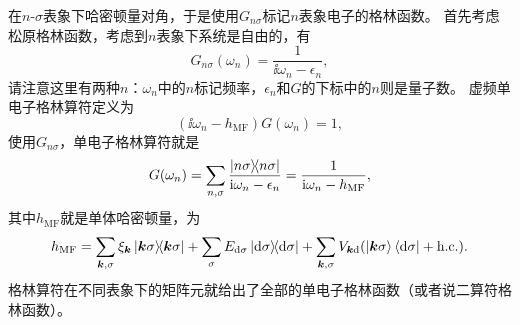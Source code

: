 在$n$-$\sigma$表象下哈密顿量对角，于是使用$G_{n\sigma}$标记$n$表象电子的格林函数。
首先考虑松原格林函数，考虑到$n$表象下系统是自由的，有
\begin{equation}
    G_{n\sigma} (\omega_n) = \frac{1}{\ii \omega_n - \epsilon_n},
\end{equation}
请注意这里有两种$n$：$\omega_n$中的$n$标记频率，$\epsilon_n$和$G$的下标中的$n$则是量子数。
虚频单电子格林算符定义为
\[
    (\ii \omega_n - {h}_\text{MF}) {G}(\omega_n) = 1,
\]
使用$G_{n \sigma}$，单电子格林算符就是
\begin{equation}
    {G}(\omega_n) = \sum_{n, \sigma} \frac{\dyad{n\sigma}}{\ii \omega_n - \epsilon_n} = \frac{1}{\ii \omega_n - {h}_\text{MF}},
\end{equation}
其中${h}_\text{MF}$就是单体哈密顿量，为
\begin{equation}
    {h}_\text{MF} = \sum_{\vb*{k}, \sigma} \xi_{\vb*{k}} \dyad{\vb*{k} \sigma} + \sum_\sigma E_{\text{d} \sigma} \dyad{\text{d} \sigma} + \sum_{\vb*{k}, \sigma} V_{\vb*{k} \text{d}} ( \ket{\vb*{k} \sigma} \bra{\text{d} \sigma} + \text{h.c.} ).
    \label{eq:anderson-green-operator}
\end{equation}
格林算符在不同表象下的矩阵元就给出了全部的单电子格林函数（或者说二算符格林函数）。

